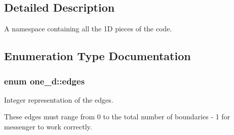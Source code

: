\subsection{Detailed Description}
A namespace containing all the 1\-D pieces of the code. 

 

\subsection{Enumeration Type Documentation}
\hypertarget{namespaceone__d_a3eef7b83405976714f7a36833aaae26d}{
\subsubsection[{edges}]{\setlength{\rightskip}{0pt plus 5cm}enum {\bf one\-\_\-d\-::edges}}}\label{namespaceone__d_a3eef7b83405976714f7a36833aaae26d}


Integer representation of the edges. 



 These edges must range from 0 to the total number of boundaries -\/ 1 for messenger to work correctly. 